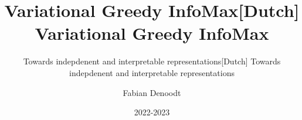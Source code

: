 \documentclass[]{book}
\title{Variational Greedy InfoMax}
\subtitle{Towards indepdenent and interpretable representations}
\author{Fabian Denoodt}
\date{2022-2023}
\begin{document}
\maketitle
\title{[Dutch] Variational Greedy InfoMax}
\subtitle{[Dutch] Towards indepdenent and interpretable representations}
\maketitle

\tableofcontents


\newcommand*\annotatedFigureBoxCustom[8]{\draw[#5,thick,rounded corners] (#1) rectangle (#2);\node at (#4) [fill=#6,thick,shape=circle,draw=#7,inner sep=2pt,font=\sffamily,text=#8] {\textbf{#3}};}

\newcommand*\annotatedFigureBox[4]{\annotatedFigureBoxCustom{#1}{#2}{#3}{#4}{white}{white}{black}{black}}


\newcommand*\annotatedFigureText[5]{\node[draw=none, anchor=south west, text=#2, inner sep=0, text width=#3\linewidth,font=\sffamily\fontsize{#5}{14}\selectfont] at (#1){#4};}


\newenvironment {annotatedFigure}[1]{\centering\begin{tikzpicture}
		\node[anchor=south west,inner sep=0] (image) at (0,0) { #1};\begin{scope}[x={(image.south east)},y={(image.north west)}]}{\end{scope}\end{tikzpicture}}


\newcommand{\vect}[1]{\mathbf{#1}}
\newcommand{\vecti}[1]{\mathbf{#1}^{(i)}}
\newcommand{\kl}[2]{D_{KL} \left( #1 \mid \mid #2 \right)}
\newcommand{\condp}[2]{p(#1 \mid #2)} %
\newcommand{\condq}[2]{q(#1 \mid #2)} %
\newcommand{\probzx}[0]{\condp{\vect{z}}{\vecti{x}}} %
\newcommand{\probxz}[0]{\condp{\vecti{x}}{\vect{z}}} %
\newcommand{\qprobzx}[0]{\condq{\vect{z}}{\vecti{x}}} %
\newcommand{\qprobqxz}[0]{\condq{\vecti{x}}{\vect{z}}} %
\end{document}
